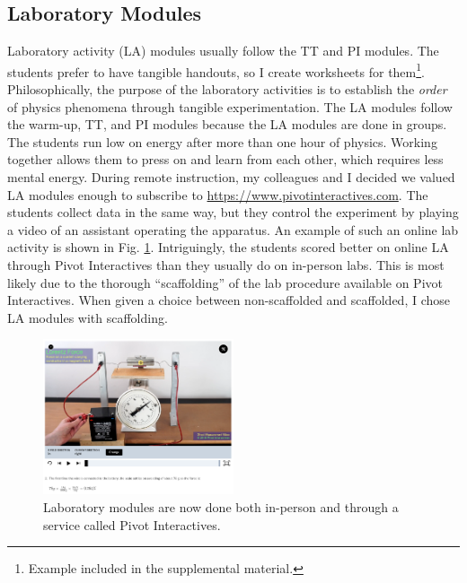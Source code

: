 \documentclass[../../../main.tex]{subfiles}
\begin{document}
\subsection{Laboratory Modules}
\label{sec:la}

Laboratory activity (LA) modules usually follow the TT and PI modules.  The students prefer to have tangible handouts, so I create worksheets for them\footnote{Example included in the supplemental material.}.  Philosophically, the purpose of the laboratory activities is to establish the \textit{order} of physics phenomena through tangible experimentation.  The LA modules follow the warm-up, TT, and PI modules because the LA modules are done in groups.  The students run low on energy after more than one hour of physics.  Working together allows them to press on and learn from each other, which requires less mental energy.  During remote instruction, my colleagues and I decided we valued LA modules enough to subscribe to \url{https://www.pivotinteractives.com}.  The students collect data in the same way, but they control the experiment by playing a video of an assistant operating the apparatus.  An example of such an online lab activity is shown in Fig. \ref{fig:pivot}.  Intriguingly, the students scored better on online LA through Pivot Interactives than they usually do on in-person labs.  This is most likely due to the thorough ``scaffolding'' of the lab procedure available on Pivot Interactives.  When given a choice between non-scaffolded and scaffolded, I chose LA modules with scaffolding.

\begin{figure}
\centering
\includegraphics[width=0.5\textwidth]{figures/pivot.png}
\caption{\label{fig:pivot}  Laboratory modules are now done both in-person and through a service called Pivot Interactives.}
\end{figure}
\end{document}
